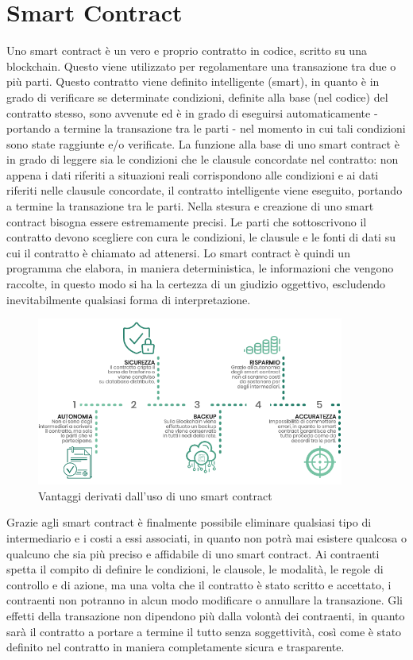 \section{Smart Contract}
Uno smart contract è un vero e proprio contratto in codice, scritto su una blockchain. Questo viene utilizzato per regolamentare una transazione tra due o più parti. Questo contratto viene definito intelligente (smart), in quanto è in grado di verificare se determinate condizioni, definite alla base (nel codice) del contratto stesso, sono avvenute ed è in grado di eseguirsi automaticamente - portando a termine la transazione tra le parti - nel momento in cui tali condizioni sono state raggiunte e/o verificate.
La funzione alla base di uno smart contract è in grado di leggere sia le condizioni che le clausule concordate nel contratto: non appena i dati riferiti a situazioni reali corrispondono alle condizioni e ai dati riferiti nelle clausule concordate, il contratto intelligente viene eseguito, portando a termine la transazione tra le parti.
Nella stesura e creazione di uno smart contract bisogna essere estremamente precisi. Le parti che sottoscrivono il contratto devono scegliere con cura le condizioni, le clausule e le fonti di dati su cui il contratto è chiamato ad attenersi. Lo smart contract è quindi un programma che elabora, in maniera deterministica, le informazioni che vengono raccolte, in questo modo si ha la certezza di un giudizio oggettivo, escludendo inevitabilmente qualsiasi forma di interpretazione.
\begin{figure}[h]
    \centering
    \includegraphics[width=0.9\textwidth]{img/smart-contract.png}
    \caption{Vantaggi derivati dall'uso di uno smart contract}
    \label{fig:smart-contract}
\end{figure}
Grazie agli smart contract è finalmente possibile eliminare qualsiasi tipo di intermediario e i costi a essi associati, in quanto non potrà mai esistere qualcosa o qualcuno che sia più preciso e affidabile di uno smart contract.
Ai contraenti spetta il compito di definire le condizioni, le clausole, le modalità, le regole di controllo e di azione, ma una volta che il contratto è stato scritto e accettato, i contraenti non potranno in alcun modo modificare o annullare la transazione. Gli effetti della transazione non dipendono più dalla volontà dei contraenti, in quanto sarà il contratto a portare a termine il tutto senza soggettività, così come è stato definito nel contratto in maniera completamente sicura e trasparente.
